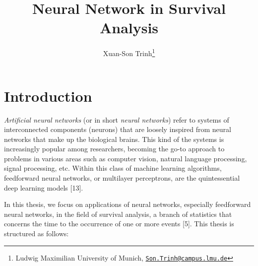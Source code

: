 \documentclass[
]{article}
\title{\textbf{Neural Network in Survival Analysis}}
\author{Xuan-Son Trinh\footnote{Ludwig Maximilian University of Munich, \href{mailto:Son.Trinh@campus.lmu.de}{\nolinkurl{Son.Trinh@campus.lmu.de}}}}
\date{}
\begin{document}
\maketitle

{
\setcounter{tocdepth}{5}
\tableofcontents
}
\setlength{\parindent}{0pt}

\newpage

\hypertarget{introduction}{%
\section{Introduction}\label{introduction}}

\emph{Artificial neural networks} (or in short \emph{neural networks}) refer to systems of interconnected components (neurons) that are loosely inspired from neural networks that make up the biological brains. This kind of the systems is increasingly popular among researchers, becoming the go-to approach to problems in various areas such as computer vision, natural language processing, signal processing, etc. Within this class of machine learning algorithms, feedforward neural networks, or multilayer perceptrons, are the quintessential deep learning models {[}13{]}.

In this thesis, we focus on applications of neural networks, especially feedforward neural networks, in the field of survival analysis, a branch of statistics that concerns the time to the occurrence of one or more events {[}5{]}. This thesis is structured as follows:
\end{document}
